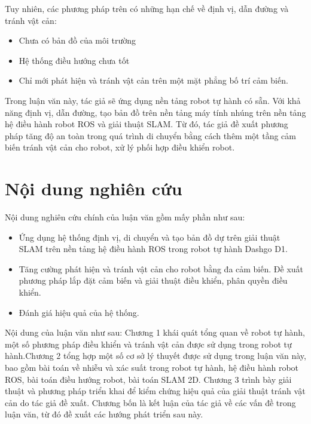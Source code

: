 Tuy nhiên, các phương pháp trên có những hạn chế về định vị, dẫn đường và tránh vật cản:
\begin{itemize}
  \item Chưa có bản đồ của môi trường
  \item Hệ thống điều hướng chưa tốt
  \item Chỉ mới phát hiện và tránh vật cản trên một mặt phẳng bố trí cảm biến.
\end{itemize}

Trong luận văn này, tác giả sẽ ứng dụng nền tảng robot tự hành có sẵn. Với khả năng định vị, dẫn đường, tạo bản đồ trên nền tảng máy tính nhúng trên nền tảng hệ điều hành robot ROS và giải thuật SLAM. Từ đó, tác giả đề xuất phương pháp tăng độ an toàn trong quá trình di chuyển bằng cách thêm một tầng cảm biến tránh vật cản cho robot, xử lý phối hợp điều khiển robot.

\section{Nội dung nghiên cứu}
Nội dung nghiên cứu chính của luận văn gồm mấy phần như sau:

\begin{itemize}
  \item Ứng dụng hệ thống định vị, di chuyển và tạo bản đồ dự trên giải thuật SLAM trên nền tảng hệ điều hành ROS trong robot tự hành Dashgo D1.
  \item Tăng cường phát hiện và tránh vật cản cho robot bằng đa cảm biến. Đề xuất phương pháp lắp đặt cảm biến và giải thuật điều khiển, phân quyền điều khiển.
  \item Đánh giá hiệu quả của hệ thống.
\end{itemize}

Nội dung của luận văn như sau: Chương 1 khái quát tổng quan về robot tự hành, một số phương pháp điều khiển và tránh vật cản được sử dụng trong robot tự hành.Chương 2 tổng hợp một số cơ sở lý thuyết được sử dụng trong luận văn này, bao gồm bài toán về nhiễu và xác suất trong robot tự hành, hệ điều hành robot ROS, bài toán điều hướng robot, bài toán SLAM 2D. Chương 3 trình bày giải thuật và phương pháp triển khai để kiểm chứng hiệu quả của giải thuật tránh vật cản do tác giả đề xuất. Chương bốn là kết luận của tác giả về các vấn đề trong luận văn, từ đó đề xuất các hướng phát triển sau này.

